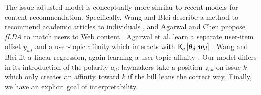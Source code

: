 
The issue-adjusted model is conceptually more similar to recent
models for content recommendation. Specifically, Wang and Blei
describe a method to recommend academic articles to individuals
\cite{wang:2011}, and Agarwal and Chen propose \emph{fLDA} to match
users to Web content \cite{agarwal:2010}. Agarwal et al. learn a
separate user-item offset $y_{ud}$ and a user-topic affinity which
interacts with $\mathbb{E}_q\left[\bm \theta_d | \bm w_d\right]$ \cite{agarwal:2010}.
Wang and Blei fit a linear regression, again learning a user-topic
affinity \cite{wang:2011}.  Our model differs in its introduction of
the polarity $a_d$: lawmakers take a position $z_{uk}$ on issue $k$
which only creates an affinity toward $k$ if the bill leans the
correct way.  Finally, we have an explicit goal of interpretability.





